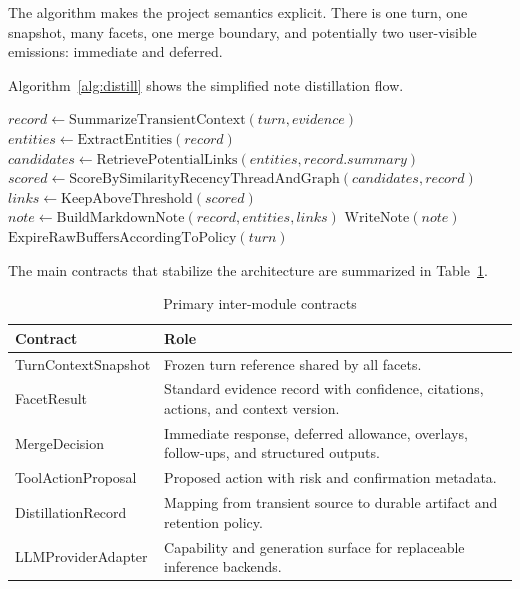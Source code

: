 \documentclass[conference]{IEEEtran}
\begin{document}
The algorithm makes the project semantics explicit. There is one turn, one snapshot, many facets, one merge boundary, and potentially two user-visible emissions: immediate and deferred.

Algorithm~\ref{alg:distill} shows the simplified note distillation flow.

\begin{algorithm}[t]
\caption{Distillation, linking, and raw-data expiry}
\label{alg:distill}
\begin{algorithmic}[1]
\State $record \gets \mathrm{SummarizeTransientContext}(turn, evidence)$
\State $entities \gets \mathrm{ExtractEntities}(record)$
\State $candidates \gets \mathrm{RetrievePotentialLinks}(entities, record.summary)$
\State $scored \gets \mathrm{ScoreBySimilarityRecencyThreadAndGraph}(candidates, record)$
\State $links \gets \mathrm{KeepAboveThreshold}(scored)$
\State $note \gets \mathrm{BuildMarkdownNote}(record, entities, links)$
\State $\mathrm{WriteNote}(note)$
\State $\mathrm{ExpireRawBuffersAccordingToPolicy}(turn)$
\EndProcedure
\end{algorithmic}
\end{algorithm}

The main contracts that stabilize the architecture are summarized in Table~\ref{tab:contracts}.

\begin{table}[t]
\caption{Primary inter-module contracts}
\label{tab:contracts}
\centering
\small
\begin{tabular}{>{\raggedright\arraybackslash}p{} >{\raggedright\arraybackslash}p{}}
\toprule
\textbf{Contract} & \textbf{Role} \\
\midrule
TurnContextSnapshot & Frozen turn reference shared by all facets. \\
FacetResult & Standard evidence record with confidence, citations, actions, and context version. \\
MergeDecision & Immediate response, deferred allowance, overlays, follow-ups, and structured outputs. \\
ToolActionProposal & Proposed action with risk and confirmation metadata. \\
DistillationRecord & Mapping from transient source to durable artifact and retention policy. \\
LLMProviderAdapter & Capability and generation surface for replaceable inference backends. \\
\bottomrule
\end{tabular}
\end{table}
\end{document}
